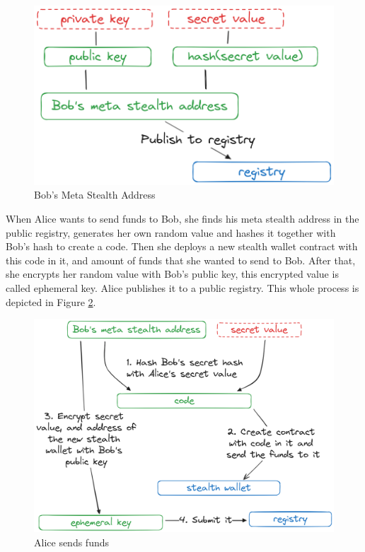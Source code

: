 \documentclass[conference,comsoc,10pt]{IEEEtran}
\begin{document}
    \begin{figure}[h]
        \centering
        \includegraphics[scale=0.20]{./assets/images/meta-stealth-address.png}
        \caption{Bob's Meta Stealth Address}
        \label{fig:bobs-meta-address}
    \end{figure}

    When Alice wants to send funds to Bob, she finds his meta stealth address
    in the public registry, generates her own random value and hashes it together
    with Bob's hash to create a code. Then she deploys a new stealth wallet
    contract with this code in it, and amount of funds that she wanted to send
    to Bob. After that, she encrypts her random value with Bob's public key,
    this encrypted value is called ephemeral key. Alice publishes it to a
    public registry. This whole process is depicted in Figure \ref{fig:sending-funds}. 

    \begin{figure}[h]
        \centering
        \includegraphics[scale=0.17]{./assets/images/sending-funds.png}
        \caption{Alice sends funds}
        \label{fig:sending-funds}
    \end{figure}
\end{document}
